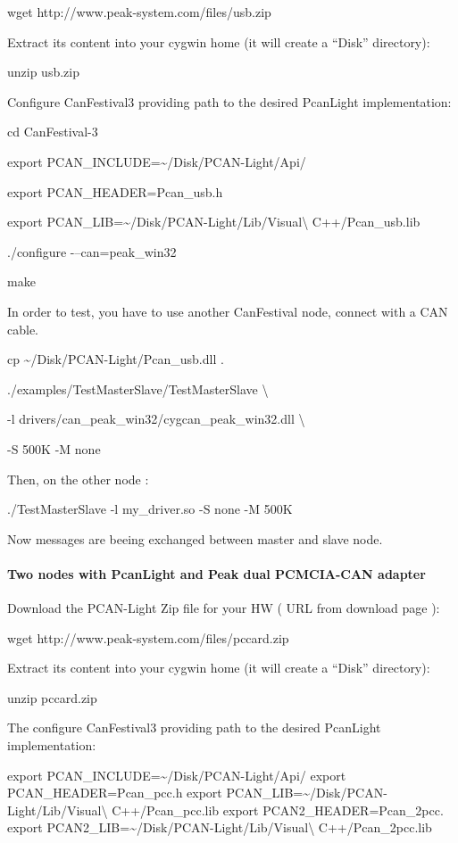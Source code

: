 \documentclass[a4paper,12pt]{book}
\begin{document}
{\ttfamily
wget http://www.peak{}-system.com/files/usb.zip}

Extract its content into your cygwin home (it will create a ``Disk''
directory):

{\ttfamily
unzip usb.zip}

Configure CanFestival3 providing path to the desired PcanLight
implementation:

{\ttfamily
cd CanFestival{}-3}

{\ttfamily
export PCAN\_INCLUDE=\~{}/Disk/PCAN{}-Light/Api/}

{\ttfamily
export PCAN\_HEADER=Pcan\_usb.h}

{\ttfamily
export PCAN\_LIB=\~{}/Disk/PCAN{}-Light/Lib/Visual{\textbackslash}
C++/Pcan\_usb.lib}

{\ttfamily
./configure {}-{--}can=peak\_win32}

{\ttfamily
make}

In order to test, you have to use another CanFestival node, connect with
a CAN cable.

{\ttfamily
cp \~{}/Disk/PCAN{}-Light/Pcan\_usb.dll .}

{\ttfamily
./examples/TestMasterSlave/TestMasterSlave {\textbackslash}}

{\ttfamily
  {}-l drivers/can\_peak\_win32/cygcan\_peak\_win32.dll
{\textbackslash}}

{\ttfamily
  {}-S 500K {}-M none}

Then, on the other node :

{\ttfamily
./TestMasterSlave {}-l my\_driver.so {}-S none {}-M 500K}

Now messages are beeing exchanged between master and slave node.

\paragraph{Two nodes with PcanLight and Peak dual PCMCIA{}-CAN adapter}
Download the PCAN{}-Light Zip file for your HW ( URL from download page
): 

{\ttfamily
wget http://www.peak{}-system.com/files/pccard.zip}

Extract its content into your cygwin home (it will create a ``Disk''
directory):

{\ttfamily
unzip pccard.zip}

The configure CanFestival3 providing path to the desired PcanLight
implementation:

{\ttfamily
export PCAN\_INCLUDE=\~{}/Disk/PCAN{}-Light/Api/\newline
export PCAN\_HEADER=Pcan\_pcc.h\newline
export PCAN\_LIB=\~{}/Disk/PCAN{}-Light/Lib/Visual{\textbackslash}
C++/Pcan\_pcc.lib\newline
export PCAN2\_HEADER=Pcan\_2pcc.\newline
export PCAN2\_LIB=\~{}/Disk/PCAN{}-Light/Lib/Visual{\textbackslash}
C++/Pcan\_2pcc.lib}
\end{document}
